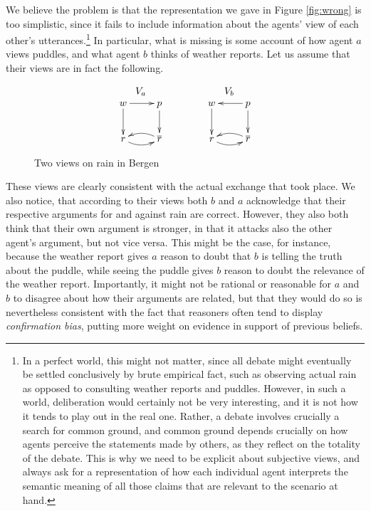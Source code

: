 \documentclass[greybox]{svmult}
\renewcommand{\bar}[1]{\overline{#1}}
\begin{document}
We believe the problem is that the representation we gave in Figure \ref{fig:wrong} is too simplistic, since it fails to include information about the agents' view of each other's utterances.\footnote{In a perfect world, this might not matter, since all debate might eventually be settled conclusively by brute empirical fact, such as observing actual rain as opposed to consulting weather reports and puddles. However, in such a world, deliberation would certainly not be very interesting, and it is not how it tends to play out in the real one. Rather, a debate involves crucially a search for common ground, and common ground depends crucially on how agents perceive the statements made by others, as they reflect on the totality of the debate. This is why we need to be explicit about subjective views, and always ask for a representation of how each individual agent interprets the semantic meaning of all those claims that are relevant to the scenario at hand.}
In particular, what is missing is some account of how agent $a$ views puddles, and what agent $b$ thinks of weather reports. Let us assume that their views are in fact the following.
\begin{figure}
$$\begin{array}{cc}
V_{a} \hspace{3em} & V_{b} \\
\xymatrix{ w \ar[d] \ar[r] & p \ar[d] \\ r \ar@/_/[r] & \bar r \ar@/_/[l] } \hspace{3em} &
\xymatrix{w \ar[d] & p \ar[d] \ar[l] \\ r \ar@/_/[r] & \bar r \ar@/_/[l] }
\end{array}$$
\caption{Two views on rain in Bergen}
\label{rainview}
\end{figure}
These views are clearly consistent with the actual exchange that took place. We also notice, that according to their views both $b$ and $a$ acknowledge that their respective arguments for and against rain are correct. However, they also both think that their own argument is stronger, in that it attacks also the other agent's argument, but not vice versa. This might be the case, for instance, because the weather report gives $a$ reason to doubt that $b$ is telling the truth about the puddle, while seeing the puddle gives $b$ reason to doubt the relevance of the weather report. Importantly, it might not be rational or reasonable for $a$ and $b$ to disagree about how their arguments are related, but that they would do so is nevertheless consistent with the fact that reasoners often tend to display \emph{confirmation bias}, putting more weight on evidence in support of previous beliefs.
\end{document}

